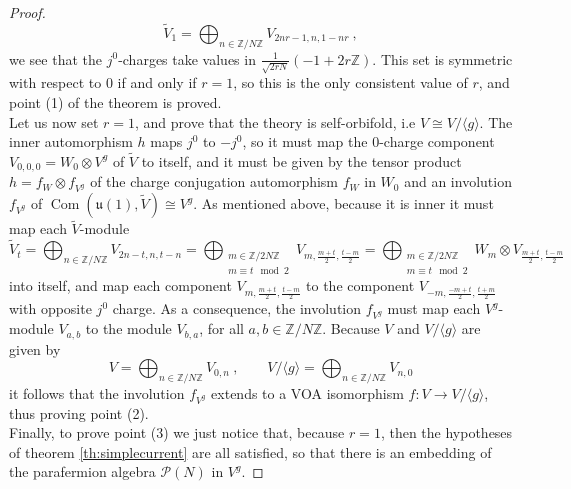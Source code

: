 \documentclass[10pt,a4paper]{amsart}
\DeclareMathOperator{\Com}{Com}
\newcommand{\ZZ}{\mathbb{Z}}
\newcommand{\alg}[1]{\mathfrak{#1}}
\newcommand{\be}{\begin{equation}}
\newcommand{\ee}{\end{equation}}
\newcommand{\paraf}{\mathcal{P}}
\begin{document}
\begin{proof}
\be \tilde V_1=\bigoplus_{n\in \ZZ/N\ZZ} V_{2nr-1,n,1-nr}\ ,
\ee we see that the $j^0$-charges take values in $\frac{1}{\sqrt{2rN}} (-1+2r\ZZ)$. This set is symmetric with respect to $0$ if and only if $r=1$, so this is the only consistent value of $r$, and point (1) of the theorem is proved.\\
Let us now set $r=1$, and prove that the theory is self-orbifold, i.e $V\cong V/\langle g\rangle$. The inner automorphism $h$ maps $j^0$ to $-j^0$, so it must map the $0$-charge component $V_{0,0,0}=W_0\otimes V^g$ of $\tilde V$ to itself, and it must be given by the tensor product $h=f_{W}\otimes f_{V^g}$ of the charge conjugation automorphism $f_W$ in $W_0$ and an involution $f_{V^g}$ of  $\Com(\alg{u}(1),\tilde V)\cong V^g$. As mentioned above, because it is inner it must map each $\tilde V$-module 
\be \tilde V_t=\bigoplus_{n\in \ZZ/N\ZZ} V_{2n-t,n,t-n}=\bigoplus_{\substack{m\in \ZZ/2N\ZZ\\m\equiv t\mod 2}} V_{m,\frac{m+t}{2},\frac{t-m}{2}}=\bigoplus_{\substack{m\in \ZZ/2N\ZZ\\m\equiv t\mod 2}} W_m\otimes V_{\frac{m+t}{2},\frac{t-m}{2}}
\ee  into itself, and map each component $ V_{m,\frac{m+t}{2},\frac{t-m}{2}}$ to the component $V_{-m,\frac{-m+t}{2},\frac{t+m}{2}}$ with opposite $j^0$ charge. As a consequence, the involution $f_{V^g}$ must map each $V^g$-module $V_{a,b}$ to the module $V_{b,a}$, for all $a,b\in \ZZ/N\ZZ$. Because $V$ and $V/\langle g\rangle$ are given by
\be V=\bigoplus_{n\in \ZZ/N\ZZ} V_{0,n}\ ,\qquad V/\langle g\rangle=\bigoplus_{n\in \ZZ/N\ZZ} V_{n,0}
\ee it follows that the involution $f_{V^g}$ extends to a VOA isomorphism $f: V\to V/\langle g\rangle$, thus proving point (2).
\\
Finally, to prove point (3) we just notice that, because $r=1$, then the hypotheses of theorem \ref{th:simplecurrent} are all satisfied, so that there is an embedding of the parafermion algebra $\paraf(N)$ in $V^g$.
\end{proof}
\end{document}
